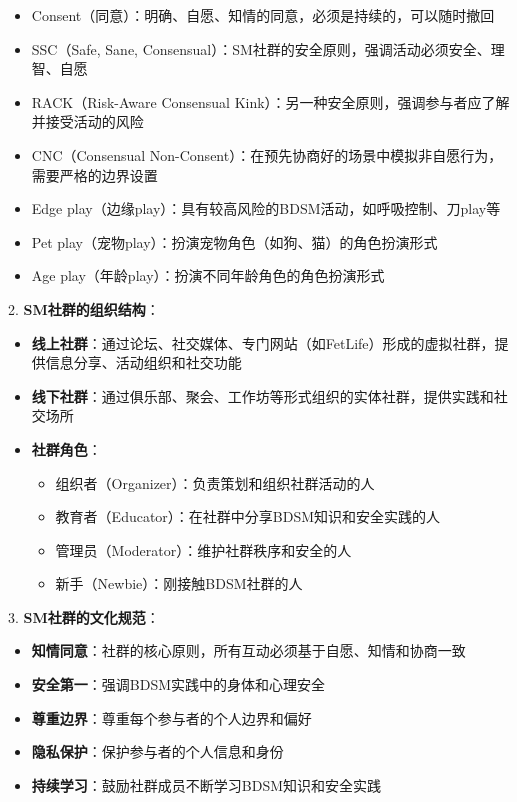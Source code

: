 \documentclass[12pt,UTF8]{ctexbook}
\begin{document}
\begin{itemize}
\begin{itemize}
    \item Consent（同意）：明确、自愿、知情的同意，必须是持续的，可以随时撤回
    \item SSC（Safe, Sane, Consensual）：SM社群的安全原则，强调活动必须安全、理智、自愿
    \item RACK（Risk-Aware Consensual Kink）：另一种安全原则，强调参与者应了解并接受活动的风险
    \item CNC（Consensual Non-Consent）：在预先协商好的场景中模拟非自愿行为，需要严格的边界设置
    \item Edge play（边缘play）：具有较高风险的BDSM活动，如呼吸控制、刀play等
    \item Pet play（宠物play）：扮演宠物角色（如狗、猫）的角色扮演形式
    \item Age play（年龄play）：扮演不同年龄角色的角色扮演形式
    \end{itemize}
  \end{itemize}

2. \textbf{SM社群的组织结构}：
  \begin{itemize}
  \item \textbf{线上社群}：通过论坛、社交媒体、专门网站（如FetLife）形成的虚拟社群，提供信息分享、活动组织和社交功能
  \item \textbf{线下社群}：通过俱乐部、聚会、工作坊等形式组织的实体社群，提供实践和社交场所
  \item \textbf{社群角色}：
    \begin{itemize}
    \item 组织者（Organizer）：负责策划和组织社群活动的人
    \item 教育者（Educator）：在社群中分享BDSM知识和安全实践的人
    \item 管理员（Moderator）：维护社群秩序和安全的人
    \item 新手（Newbie）：刚接触BDSM社群的人
    \end{itemize}
  \end{itemize}

3. \textbf{SM社群的文化规范}：
  \begin{itemize}
  \item \textbf{知情同意}：社群的核心原则，所有互动必须基于自愿、知情和协商一致
  \item \textbf{安全第一}：强调BDSM实践中的身体和心理安全
  \item \textbf{尊重边界}：尊重每个参与者的个人边界和偏好
  \item \textbf{隐私保护}：保护参与者的个人信息和身份
  \item \textbf{持续学习}：鼓励社群成员不断学习BDSM知识和安全实践
  \end{itemize}
\end{document}
